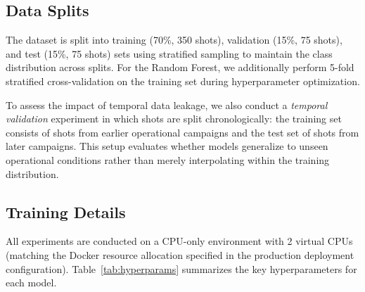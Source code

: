 \documentclass[twocolumn]{article}
\begin{document}
\subsection{Data Splits}

The dataset is split into training (70\%, 350 shots),
validation (15\%, 75 shots), and test (15\%, 75 shots) sets
using stratified sampling to maintain the class distribution
across splits.
For the Random Forest, we additionally perform 5-fold
stratified cross-validation on the training set during
hyperparameter optimization.

To assess the impact of temporal data leakage, we also
conduct a \emph{temporal validation} experiment in which
shots are split chronologically: the training set consists
of shots from earlier operational campaigns and the test set
of shots from later campaigns.
This setup evaluates whether models generalize to unseen
operational conditions rather than merely interpolating
within the training distribution.

\subsection{Training Details}

All experiments are conducted on a CPU-only environment
with 2 virtual CPUs (matching the Docker resource allocation
specified in the production deployment configuration).
Table~\ref{tab:hyperparams} summarizes the key
hyperparameters for each model.
\end{document}
